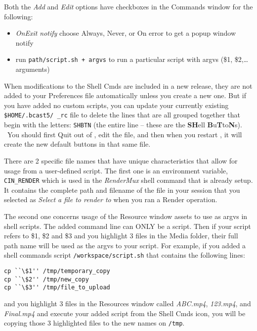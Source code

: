 Both the \textit{Add} and \textit{Edit} options have checkboxes in the Commands window for the following:

\begin{itemize}[nosep]
	\item \textit{OnExit notify} \quad  choose Always, Never, or On error to get a popup window notify
	\item run \texttt{path/script.sh + argvs} \quad to run a particular script with argvs (\$1, \$2,{\dots} arguments)
\end{itemize}


When modifications to the Shell Cmds are included in a new \CGG{} release, they are not added to your Preferences file automatically unless you create a new one. But if you have added no custom scripts, you can update your currently existing \texttt{\$HOME/.bcast5/ \CGG{}\_rc} file to delete the lines that are all grouped together that begin with the letters: \texttt{SHBTN} (the entire line -- these are the \textbf{SH}ell \textbf{B}u\textbf{T}to\textbf{N}s). \ You should first Quit out of \CGG{}, edit the file, and then when you restart \CGG{}, it will create the new default buttons in that same file.

There are 2 specific \CGG{} file names that have unique characteristics that allow for usage from a user-defined
script. The first one is an environment variable, \texttt{CIN\_RENDER} which is used in the \textit{RenderMux} shell command that is already setup. It contains the complete path and filename of the file in your session that you selected as \textit{Select a file to render to} when you ran a Render operation.

The second one concerns usage of the Resource window assets to use as argvs in shell scripts. The added command line
can ONLY be a script. Then if your script refers to \$1, \$2 and \$3 and you highlight 3 files in the Media folder,
their full path name will be used as the argvs to your script. For example, if you added a shell commands script
\texttt{/workspace/script.sh} that contains the following lines:

\begin{lstlisting}[numbers=none,xleftmargin=10mm]
cp ``\$1'' /tmp/temporary_copy
cp ``\$2'' /tmp/new_copy
cp ``\$3'' /tmp/file_to_upload
\end{lstlisting}

and you highlight 3 files in the Resources window called\textit{ ABC.mp4}, \textit{123.mp4}, and \textit{Final.mp4} and execute your added script from the Shell Cmds icon, you will be copying those 3 highlighted files to the new names on \texttt{/tmp}.

